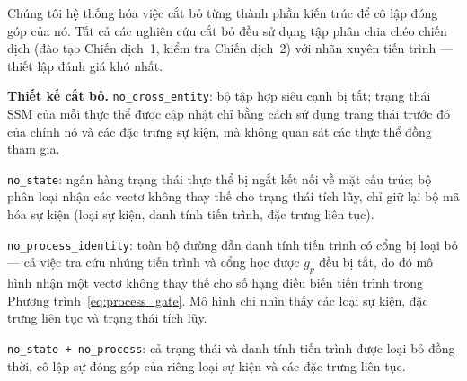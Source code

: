 \documentclass[letterpaper,twocolumn,10pt]{article}
\begin{document}
Chúng tôi hệ thống hóa việc cắt bỏ từng thành phần kiến trúc để cô lập đóng góp của nó. Tất cả các nghiên cứu cắt bỏ đều sử dụng tập phân chia chéo chiến dịch (đào tạo Chiến dịch~1, kiểm tra Chiến dịch~2) với nhãn xuyên tiến trình --- thiết lập đánh giá khó nhất.

\textbf{Thiết kế cắt bỏ.} \texttt{no\_cross\_entity}: bộ tập hợp siêu cạnh bị tắt; trạng thái SSM của mỗi thực thể được cập nhật chỉ bằng cách sử dụng trạng thái trước đó của chính nó và các đặc trưng sự kiện, mà không quan sát các thực thể đồng tham gia.

\texttt{no\_state}: ngân hàng trạng thái thực thể bị ngắt kết nối về mặt cấu trúc; bộ phân loại nhận các vectơ không thay thế cho trạng thái tích lũy, chỉ giữ lại bộ mã hóa sự kiện (loại sự kiện, danh tính tiến trình, đặc trưng liên tục).

\texttt{no\_process\_identity}: toàn bộ đường dẫn danh tính tiến trình có cổng bị loại bỏ --- cả việc tra cứu nhúng tiến trình và cổng học được $g_p$ đều bị tắt, do đó mô hình nhận một vectơ không thay thế cho số hạng điều biến tiến trình trong Phương trình~\ref{eq:process_gate}. Mô hình chỉ nhìn thấy các loại sự kiện, đặc trưng liên tục và trạng thái tích lũy.

\texttt{no\_state + no\_process}: cả trạng thái và danh tính tiến trình được loại bỏ đồng thời, cô lập sự đóng góp của riêng loại sự kiện và các đặc trưng liên tục.

\begin{table}[t]
    \centering
    \caption{Nghiên cứu cắt bỏ thành phần (phân chia chéo chiến dịch, nhãn xuyên tiến trình). Mỗi dòng loại bỏ một hoặc nhiều thành phần khỏi mô hình đầy đủ. $\Delta$ là sự thay đổi tương đối của AUPRC sự kiện.}
    \label{tab:ablation_unified}
\end{table}
\end{document}
